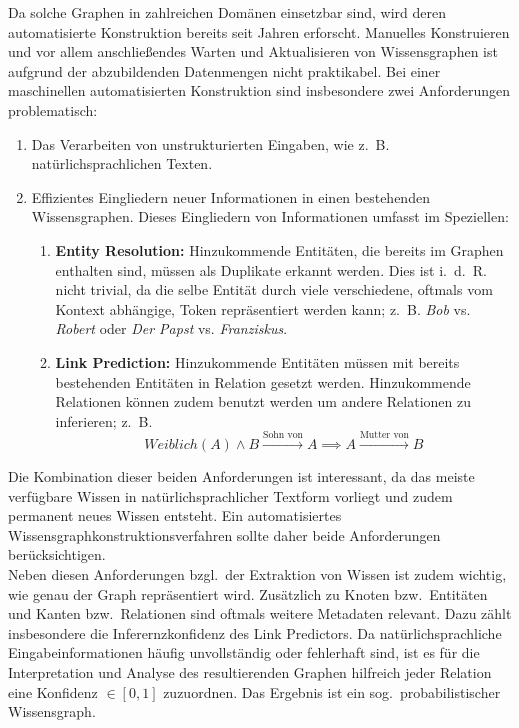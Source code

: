 \documentclass[11pt, a4paper]{scrreprt}
\begin{document}
Da solche Graphen in zahlreichen Domänen einsetzbar sind, wird deren automatisierte Konstruktion bereits seit Jahren erforscht.
Manuelles Konstruieren und vor allem anschließendes Warten und Aktualisieren von Wissensgraphen ist aufgrund der abzubildenden Datenmengen nicht praktikabel.
Bei einer maschinellen automatisierten Konstruktion sind insbesondere zwei Anforderungen problematisch:
\begin{enumerate}
	\item Das Verarbeiten von unstrukturierten Eingaben, wie z.~B. natürlichsprachlichen Texten.
	\item Effizientes Eingliedern neuer Informationen in einen bestehenden Wissensgraphen.
		Dieses Eingliedern von Informationen umfasst im Speziellen:
		\begin{enumerate}
			\item \textbf{Entity Resolution:}
				Hinzukommende Entitäten, die bereits im Graphen enthalten sind, müssen als Duplikate erkannt werden.
				Dies ist i.~d.~R. nicht trivial, da die selbe Entität durch viele verschiedene, oftmals vom Kontext abhängige, Token repräsentiert werden kann;
				z.~B. \textit{Bob} vs. \textit{Robert} oder \textit{Der Papst} vs. \textit{Franziskus}.
			\item \textbf{Link Prediction:}
				Hinzukommende Entitäten müssen mit bereits bestehenden Entitäten in Relation gesetzt werden.
				Hinzukommende Relationen können zudem benutzt werden um andere Relationen zu inferieren;
				z.~B. $$Weiblich(A) \land B \xrightarrow{\text{Sohn~von}} A \implies A \xrightarrow{\text{Mutter~von}} B$$
		\end{enumerate}
\end{enumerate}

Die Kombination dieser beiden Anforderungen ist interessant, da das meiste verfügbare Wissen in natürlichsprachlicher Textform vorliegt und zudem permanent neues Wissen entsteht.
Ein automatisiertes Wissensgraphkonstruktionsverfahren sollte daher beide Anforderungen berücksichtigen.\\

Neben diesen Anforderungen bzgl.\ der Extraktion von Wissen ist zudem wichtig, wie genau der Graph repräsentiert wird.
Zusätzlich zu Knoten bzw.\ Entitäten und Kanten bzw.\ Relationen sind oftmals weitere Metadaten relevant.
Dazu zählt insbesondere die Inferernzkonfidenz des Link Predictors.
Da natürlichsprachliche Eingabeinformationen häufig unvollständig oder fehlerhaft sind, ist es für die Interpretation und Analyse des resultierenden Graphen hilfreich jeder Relation eine Konfidenz $\in [0, 1]$ zuzuordnen.
Das Ergebnis ist ein sog.\ probabilistischer Wissensgraph.
\end{document}
